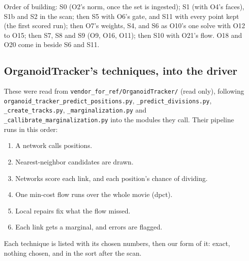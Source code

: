 Order of building: S0 (O2's norm, once the set is ingested); S1 (with O4's faces), S1b and S2 in the scan; then S5 with O6's gate, and S11 with every point kept (the first scored run); then O7's weights, S4, and S6 as O10's one solve with O12 to O15; then S7, S8 and S9 (O9, O16, O11); then S10 with O21's flow. O18 and O20 come in beside S6 and S11.

\subsection{\texorpdfstring{OrganoidTracker's techniques, into the driver}{OrganoidTracker's techniques, into the driver}}

These were read from \texttt{vendor\_\allowbreak{}for\_\allowbreak{}ref/\allowbreak{}Organoid\allowbreak{}Tracker/\allowbreak{}} (read only), following \texttt{organoid\_\allowbreak{}tracker\_\allowbreak{}predict\_\allowbreak{}positions.\allowbreak{}py}, \texttt{\_\allowbreak{}predict\_\allowbreak{}divisions.\allowbreak{}py}, \texttt{\_\allowbreak{}create\_\allowbreak{}tracks.\allowbreak{}py}, \texttt{\_\allowbreak{}marginalization.\allowbreak{}py} and \texttt{\_\allowbreak{}callibrate\_\allowbreak{}marginalization.\allowbreak{}py} into the modules they call. Their pipeline runs in this order:

\begin{enumerate}
\item A network calls positions.
\item Nearest-neighbor candidates are drawn.
\item Networks score each link, and each position's chance of dividing.
\item One min-cost flow runs over the whole movie (dpct).
\item Local repairs fix what the flow missed.
\item Each link gets a marginal, and errors are flagged.
\end{enumerate}

Each technique is listed with its chosen numbers, then our form of it: exact, nothing chosen, and in the sort after the scan.


